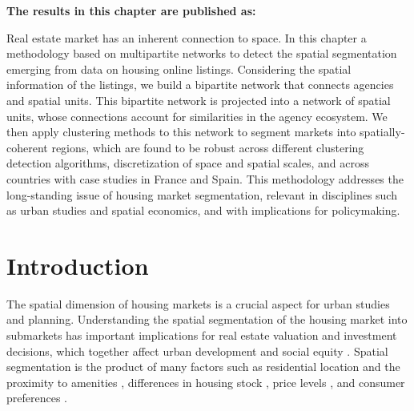 \vspace{-1.5cm}
\small
\textbf{The results in this chapter are published as:}
\vspace{0.05 cm}

\normalsize
\vspace{0.5 cm}

Real estate market has an inherent connection to space. In this chapter a methodology based on multipartite networks to detect the spatial segmentation emerging from data on housing online listings. Considering the spatial information of the listings, we build a bipartite network that connects agencies and spatial units. This bipartite network is projected into a network of spatial units, whose connections account for similarities in the agency ecosystem. We then apply clustering methods to this network to segment  markets into spatially-coherent regions, which are found to be robust across different clustering detection algorithms, discretization of space and spatial scales, and across countries with case studies in France and Spain. This methodology addresses the long-standing issue of housing market segmentation, relevant in disciplines such as urban studies and spatial economics, and with implications for policymaking. 

\section{Introduction}
\label{sec:introduction}

The spatial dimension of housing markets is a crucial aspect for urban studies and planning. Understanding the spatial segmentation of the housing market into submarkets \cite{morawakage2022housing,bourassa2003housing} has important implications for real estate valuation and investment decisions, which together affect urban development and social equity \cite{bourassa2003housing}. Spatial segmentation is the product of many factors such as residential location and the proximity to amenities \cite{bourassa2003housing}, differences in housing stock \cite{keskin2017defining}, price levels \cite{goodman1998housing}, and consumer preferences \cite{leishman2013predictive}. 

